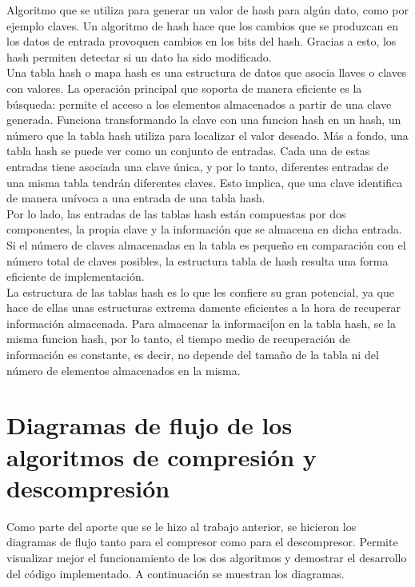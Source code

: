 \documentclass[letterpaper]{article}
\begin{document}
Algoritmo que se utiliza para generar un valor de hash para algún dato, como por ejemplo claves. Un algoritmo de hash hace que los cambios que se produzcan en los datos de entrada provoquen cambios en los bits del hash. Gracias a esto, los hash permiten detectar si un dato ha sido modificado.\\

Una tabla hash o mapa hash es una estructura de datos que asocia llaves o claves con valores. La operación principal que soporta de manera eficiente es la búsqueda: permite el acceso a los elementos almacenados a partir de una clave generada. Funciona transformando la clave con una funcion hash en un hash, un número que la tabla hash utiliza para localizar el valor deseado. Más a fondo, una tabla hash se puede ver como un conjunto de entradas. Cada una de estas entradas tiene asociada una clave única, y por lo tanto, diferentes entradas de una misma tabla tendrán diferentes claves. Esto implica, que una clave identifica de manera unívoca a una entrada de una tabla hash.\\

Por lo lado, las entradas de las tablas hash están compuestas por dos componentes, la propia clave y la información que se almacena en dicha entrada. Si el número de claves almacenadas en la tabla es pequeño en comparación con el número total de claves posibles, la estructura tabla de hash resulta una forma eficiente de implementación.\\

La estructura de las tablas hash es lo que les confiere su gran potencial, ya que hace de ellas unas estructuras extrema damente eficientes a la hora de recuperar información almacenada. Para almacenar la informaci[on en la tabla hash, se la misma funcion hash, por lo tanto, el tiempo medio de recuperación de información es constante, es decir, no depende del tamaño de la tabla ni del número de elementos almacenados en la misma.\\

\pagebreak

\section{Diagramas de flujo de los algoritmos de compresión y descompresión}
Como parte del aporte que se le hizo al trabajo anterior, se hicieron los diagramas de flujo tanto para el compresor como para el descompresor. Permite visualizar mejor el funcionamiento de los dos algoritmos y demostrar el desarrollo del código implementado. A continuación se muestran los diagramas.
\end{document}
